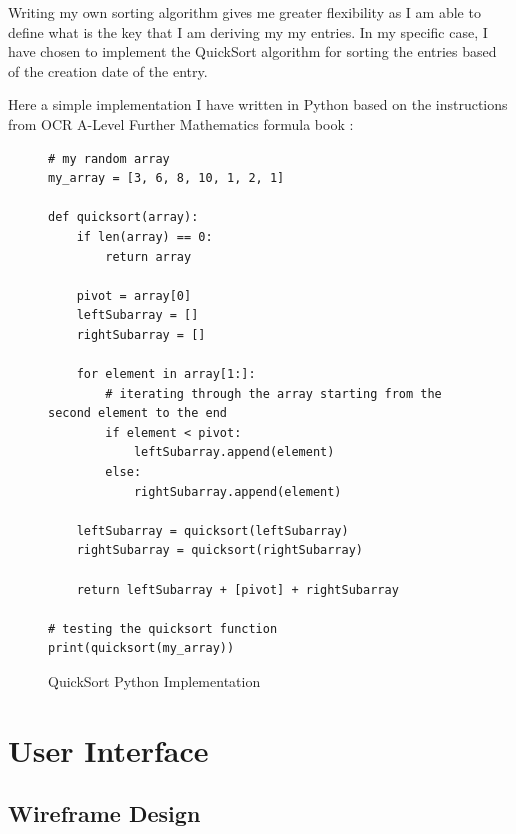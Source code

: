 Writing my own sorting algorithm gives me greater flexibility as I am able to define what is the key that I am deriving my my entries. In my specific case, I have chosen to implement the QuickSort algorithm for sorting the entries based of the creation date of the entry.

Here a simple implementation I have written in Python based on the instructions from OCR A-Level Further Mathematics formula book \cite{ocr2019furthermaths}:
\newpage
\begin{figure}[H]
    \begin{lstlisting}[style=myPython]
# my random array
my_array = [3, 6, 8, 10, 1, 2, 1]

def quicksort(array):
    if len(array) == 0:
        return array

    pivot = array[0]
    leftSubarray = []
    rightSubarray = []

    for element in array[1:]:
        # iterating through the array starting from the second element to the end
        if element < pivot:
            leftSubarray.append(element)
        else:
            rightSubarray.append(element)

    leftSubarray = quicksort(leftSubarray)
    rightSubarray = quicksort(rightSubarray)

    return leftSubarray + [pivot] + rightSubarray

# testing the quicksort function
print(quicksort(my_array))
        \end{lstlisting}  
        \caption{QuickSort Python Implementation}

\end{figure}




\section{User Interface}
\subsection{Wireframe Design}

